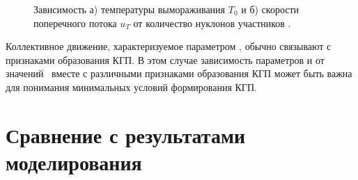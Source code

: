 \begin{figure}[ht]
	\caption{Зависимость а) температуры вымораживания $T_0$ и  б) скорости поперечного потока $u_T$ от количество нуклонов участников \Npart.}\label{fig:latex}
\end{figure}

Коллективное движение, характеризуемое параметром \ut, обычно связывают с признаками образования КГП. В этом случае зависимость параметров \To и \ut от значений \Npart \ вместе с различными признаками образования КГП может быть важна для понимания минимальных условий формирования КГП.

\section{Сравнение с результатами моделирования} \label{sect5_spectra}